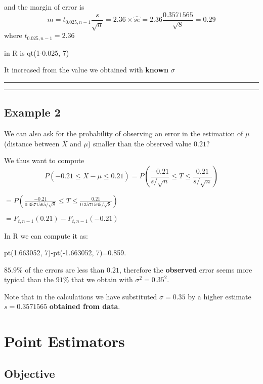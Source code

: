 \documentclass[
]{book}
\begin{document}
and the margin of error is \[m=t_{0.025, n-1} \frac{s}{\sqrt{n}}=2.36\times \hat{se}=2.36\frac{0.3571565}{\sqrt{8}}=0.29\]
where \(t_{0.025, n-1}=2.36\)

in R is qt(1-0.025, 7)

It increased from the value we obtained with \textbf{known} \(\sigma\)

\begin{center}\rule{0.5\linewidth}{0.5pt}\end{center}

\begin{center}\rule{0.5\linewidth}{0.5pt}\end{center}

\hypertarget{example-2-2}{%
\section{Example 2}\label{example-2-2}}

We can also ask for the probability of observing an error in the estimation of \(\mu\) (distance between \(\bar{X}\) and \(\mu\)) smaller than the observed value \(0.21\)?

We thus want to compute \[P(-0.21 \leq \bar{X} - \mu\leq 0.21)=P(\frac{-0.21}{s/\sqrt{n}} \leq T \leq \frac{0.21}{s/\sqrt{n}})\]

\(=P(\frac{-0.21}{0.3571565/\sqrt{8}} \leq T \leq \frac{0.21}{0.3571565/\sqrt{8}})\)

\(=F_{t, n-1}(0.21)-F_{t, n-1}(-0.21)\)

In R we can compute it as:

pt(1.663052, 7)-pt(-1.663052, 7)=0.859.

\(85.9\%\) of the errors are less than \(0.21\), therefore the \textbf{observed} error seems more typical than the \(91\%\) that we obtain with \(\sigma^2=0.35^2\).

Note that in the calculations we have substituted \(\sigma=0.35\) by a higher estimate \(s=0.3571565\) \textbf{obtained from data}.

\hypertarget{point-estimators}{%
\chapter{Point Estimators}\label{point-estimators}}

\hypertarget{objective-10}{%
\section{Objective}\label{objective-10}}
\end{document}
